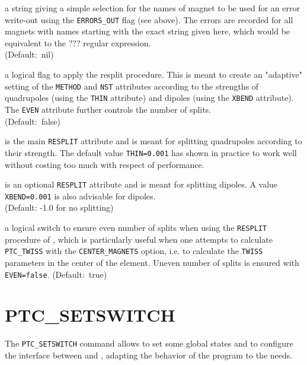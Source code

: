 \begin{madlist}
   a string giving a simple selection for the
  names of magnet to be used for an error write-out using the
  \texttt{ERRORS\_OUT} flag (see above). The errors are recorded for all 
  magnets with names starting with the exact string given here, which
  would be equivalent to the ??? regular expression.\\
  (Default:~nil)

   a logical flag to apply the \ptc resplit
  procedure. This is meant to create an "adaptive" setting of the
  \texttt{METHOD} and \texttt{NST} attributes according to the strengths
  of quadrupoles (using the \texttt{THIN}  attribute) and dipoles (using
  the \texttt{XBEND} attribute). The \texttt{EVEN} attribute further
  controls the number of splits.  \\
  (Default:~false)

   is the main \texttt{RESPLIT} attribute and is meant for
  splitting quadrupoles according to their strength. The default value
  \texttt{THIN=0.001} has shown in practice to work well without costing
  too much with respect of performance.
  
   is an optional \texttt{RESPLIT} attribute and is meant for
  splitting dipoles. A value \texttt{XBEND=0.001} is also advisable for
  dipoles. \\
  (Default: -1.0 for no splitting)

   a logical switch to ensure even number of splits when
  using the \texttt{RESPLIT}  procedure of \ptc, which is particularly
  useful when one attempts to calculate \texttt{PTC\_TWISS} with the
  \texttt{CENTER\_MAGNETS} option, i.e. to calculate the \texttt{TWISS} 
  parameters in the center of the element. 
  Uneven number of splits is ensured with \texttt{EVEN=false}.
  (Default:~true)
\end{madlist}

\section{PTC\_SETSWITCH}
\label{sec:ptc-setswitch}

The \texttt{PTC\_SETSWITCH} command allows to set some global \ptc states and to configure the interface between {\madx} and {\ptc}, adapting the behavior of the program to the needs.   


